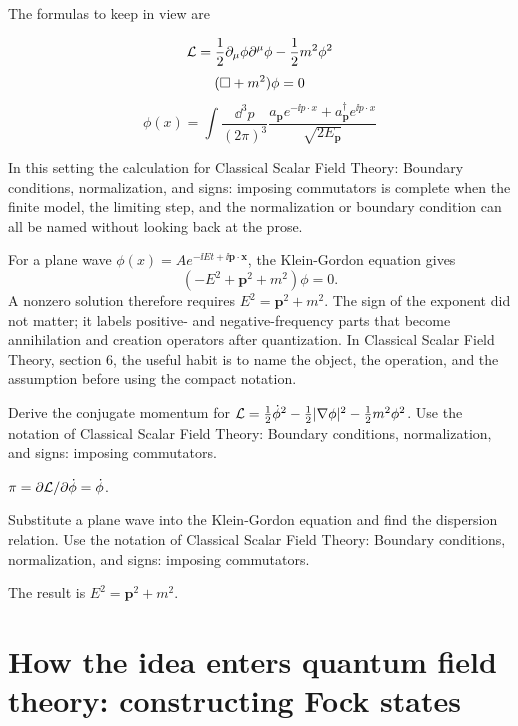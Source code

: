 The formulas to keep in view are

\[
  \mathcal L=\frac12\partial_\mu\phi\partial^\mu\phi-\frac12m^2\phi^2
\]
\[
  (\Box+m^2)\phi=0
\]
\[
  \phi(x)=\int\frac{\dd^3p}{(2\pi)^3}\frac{a_{\bm p}e^{-\ii p\cdot x}+a_{\bm p}^\dagger e^{\ii p\cdot x}}{\sqrt{2E_{\bm p}}}
\]

In this setting the calculation for Classical Scalar Field Theory: Boundary conditions, normalization, and signs: imposing commutators is complete when the finite model, the limiting step, and the normalization or boundary condition can all be named without looking back at the prose.




\begin{example}
For a plane wave \(\phi(x)=Ae^{-\ii Et+\ii\bm p\cdot\bm x}\), the Klein-Gordon equation gives
\[
  (-E^2+\bm p^2+m^2)\phi=0.
\]
A nonzero solution therefore requires \(E^2=\bm p^2+m^2\).  The sign of the exponent did not matter; it labels positive- and negative-frequency parts that become annihilation and creation operators after quantization.  In Classical Scalar Field Theory, section 6, the useful habit is to name the object, the operation, and the assumption before using the compact notation.
\end{example}



\begin{exercise}
Derive the conjugate momentum for \(\mathcal L=\frac12\dot\phi^2-\frac12|\nabla\phi|^2-\frac12m^2\phi^2\).  Use the notation of Classical Scalar Field Theory: Boundary conditions, normalization, and signs: imposing commutators.
\begin{answer}
\(\pi=\partial\mathcal L/\partial\dot\phi=\dot\phi\).
\end{answer}
\end{exercise}

\begin{exercise}
Substitute a plane wave into the Klein-Gordon equation and find the dispersion relation.  Use the notation of Classical Scalar Field Theory: Boundary conditions, normalization, and signs: imposing commutators.
\begin{answer}
The result is \(E^2=\bm p^2+m^2\).
\end{answer}
\end{exercise}



\section{How the idea enters quantum field theory: constructing Fock states}

